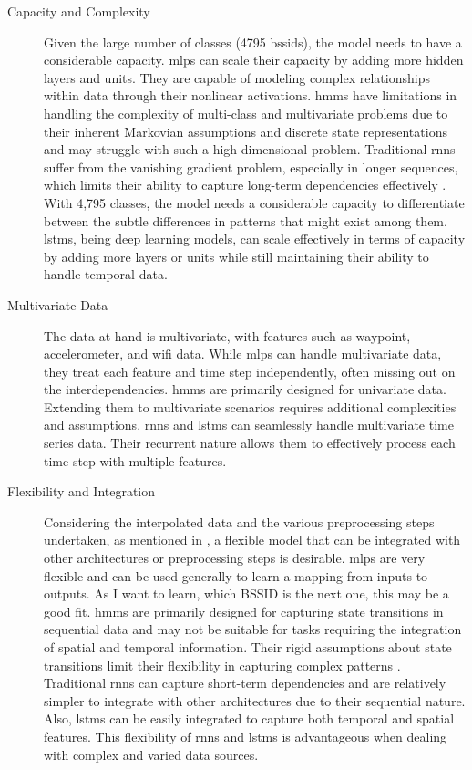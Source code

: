 \begin{description}
\item[Capacity and Complexity]
Given the large number of classes (4795 \acp{bssid}), the model needs to have a considerable capacity.
\acp{mlp} can scale their capacity by adding more hidden layers and units.
They are capable of modeling complex relationships within data through their nonlinear activations.
\acp{hmm} have limitations in handling the complexity of multi-class and multivariate problems due to their inherent Markovian assumptions and discrete state representations and may struggle with such a high-dimensional problem.
Traditional \acp{rnn} suffer from the vanishing gradient problem, especially in longer sequences, which limits their ability to capture long-term dependencies effectively \cite{rnn_difficulties_2013}.
With 4,795 classes, the model needs a considerable capacity to differentiate between the subtle differences in patterns that might exist among them. 
\acp{lstm}, being deep learning models, can scale effectively in terms of capacity by adding more layers or units while still maintaining their ability to handle temporal data.
\end{description}

\begin{description}
\item [Multivariate Data]
The data at hand is multivariate, with features such as waypoint, accelerometer, and \ac{wifi} data.
While \acp{mlp} can handle multivariate data, they treat each feature and time step independently, often missing out on the interdependencies.
\acp{hmm} are primarily designed for univariate data. Extending them to multivariate scenarios requires additional complexities and assumptions.
\acp{rnn} and \acp{lstm} can seamlessly handle multivariate time series data. 
Their recurrent nature allows them to effectively process each time step with multiple features.
\end{description}

\begin{description}
\item[Flexibility and Integration]
Considering the interpolated data and the various preprocessing steps undertaken, as mentioned in , a flexible model that can be integrated with other architectures or preprocessing steps is desirable. 
\acp{mlp} are very flexible and can be used generally to learn a mapping from inputs to outputs. \cite{mlp-vs-cnn-vs-rnn} 
As I want to learn, which BSSID is the next one, this may be a good fit.
\acp{hmm} are primarily designed for capturing state transitions in sequential data and may not be suitable for tasks requiring the integration of spatial and temporal information.
Their rigid assumptions about state transitions limit their flexibility in capturing complex patterns \cite{hmm-rabiner-1989}.
Traditional \acp{rnn} can capture short-term dependencies and are relatively simpler to integrate with other architectures due to their sequential nature.
Also, \acp{lstm} can be easily integrated to capture both temporal and spatial features. 
This flexibility of \acp{rnn} and \acp{lstm} is advantageous when dealing with complex and varied data sources.
\end{description}


